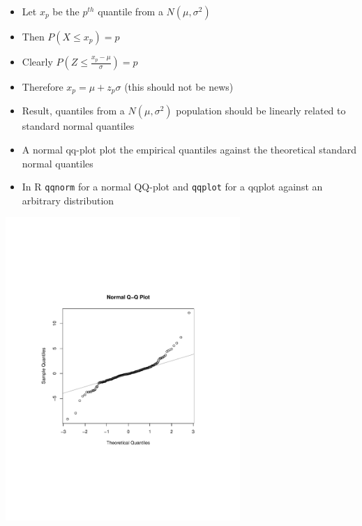 \documentclass[aspectratio=169]{beamer}
\begin{document}
\begin{frame}
\begin{itemize}
\item Let $x_p$ be the $p^{th}$ quantile from a $N(\mu, \sigma^2)$
\item Then $P(X \leq x_p) = p$
\item Clearly $P(Z \leq \frac{x_p - \mu}{\sigma}) = p$
\item Therefore $x_p = \mu + z_p \sigma$ (this should not be news)
\item Result, quantiles from a $N(\mu,\sigma^2)$ population should
  be linearly related to standard normal quantiles
\item A normal qq-plot plot the empirical quantiles against the
  theoretical standard normal quantiles
\item In R \texttt{qqnorm} for a normal QQ-plot and  \texttt{qqplot}
  for a qqplot against an arbitrary distribution
\end{itemize}
\end{frame}

\begin{frame}
\includegraphics[width=3.5in]{qqnorm1.pdf}
\end{frame}
\end{document}
